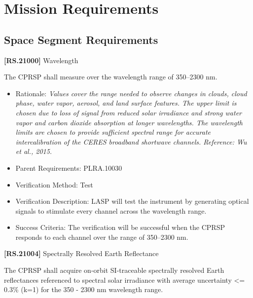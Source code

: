 \documentclass[12pt,oneside,oldfontcommands]{memoir}
\begin{document}
\section{Mission Requirements}
\label{missionrequirements}

\subsection{Space Segment Requirements}
\label{spacesegmentrequirements}

\textbf{[RS.21000]} Wavelength

The \gls{CPRSP} shall \gls{measure} over the wavelength range of 350--2300 nm.

\begin{itemize}
\item{} Rationale: \emph{Values cover the range needed to observe changes in clouds, cloud phase, water vapor, aerosol, and land surface features. The upper limit is chosen due to loss of signal from reduced solar irradiance and strong water vapor and carbon dioxide absorption at longer wavelengths. The wavelength limits are chosen to provide sufficient spectral range for accurate intercalibration of the CERES broadband shortwave channels. Reference: Wu et al., 2015.}

\item{} Parent Requirements: PLRA.10030

\item{} Verification Method: Test

\item{} Verification Description: \gls{LASP} will \gls{test} the instrument by generating optical signals to stimulate every channel across the wavelength range.

\item{} Success Criteria: The verification will be successful when the \gls{CPRSP} responds to each channel over the range of 350--2300 nm.

\end{itemize}

\textbf{[RS.21004]} Spectrally Resolved Earth Reflectance

The \gls{CPRSP} shall acquire on-orbit \gls{SI}-traceable spectrally resolved Earth reflectances referenced to spectral solar irradiance with average uncertainty <= 0.3\% (k=1) for the 350 - 2300 nm wavelength range.
\end{document}
